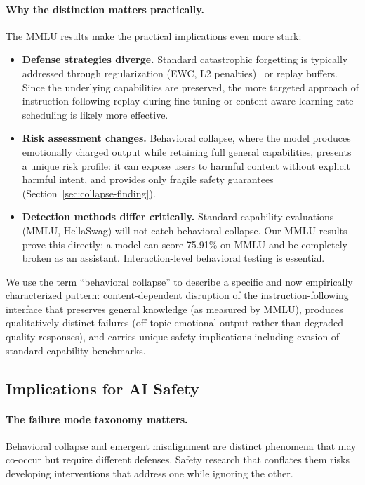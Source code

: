 \documentclass{article}
\begin{document}
\paragraph{Why the distinction matters practically.}
The MMLU results make the practical implications even more stark:
\begin{itemize}[leftmargin=*,itemsep=2pt]
  \item \textbf{Defense strategies diverge.} Standard catastrophic forgetting is
    typically addressed through regularization (EWC, L2
    penalties)~\citep{kirkpatrick2017overcoming} or replay buffers. Since the
    underlying capabilities are preserved, the more targeted approach of
    instruction-following replay during fine-tuning or content-aware learning
    rate scheduling is likely more effective.
  \item \textbf{Risk assessment changes.} Behavioral collapse, where the model
    produces emotionally charged output while retaining full general
    capabilities, presents a unique risk profile: it can expose users to harmful
    content without explicit harmful intent, and provides only fragile safety
    guarantees (Section~\ref{sec:collapse-finding}).
  \item \textbf{Detection methods differ critically.} Standard capability
    evaluations (MMLU, HellaSwag) will not catch behavioral collapse. Our MMLU
    results prove this directly: a model can score 75.91\% on MMLU and be
    completely broken as an assistant. Interaction-level behavioral testing is
    essential.
\end{itemize}

We use the term ``behavioral collapse'' to describe a specific and now
empirically characterized pattern: content-dependent disruption of the
instruction-following interface that preserves general knowledge (as measured by
MMLU), produces qualitatively distinct failures (off-topic emotional output
rather than degraded-quality responses), and carries unique safety implications
including evasion of standard capability benchmarks.

\subsection{Implications for AI Safety}

\paragraph{The failure mode taxonomy matters.}
Behavioral collapse and emergent misalignment are distinct phenomena that may
co-occur but require different defenses. Safety research that conflates them
risks developing interventions that address one while ignoring the other.
\end{document}
